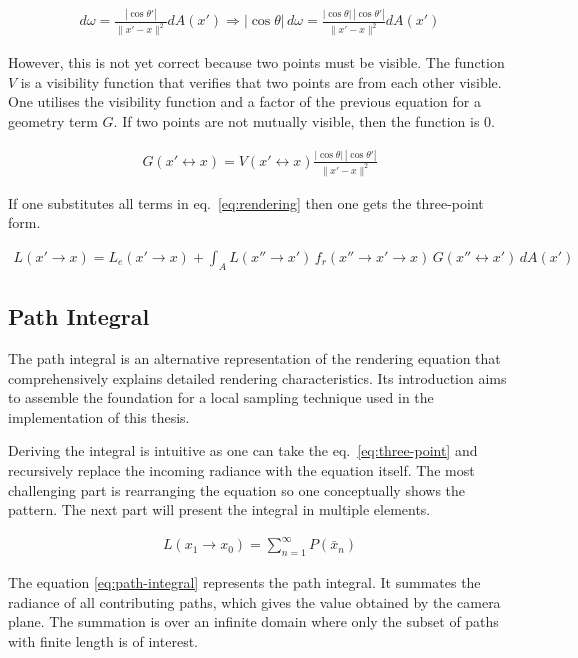 \begin{align*}
d\omega=\frac{|\cos\theta'|}{\|x'-x\|^2}dA(x') \Rightarrow |\cos\theta|\,d\omega=\frac{|\cos\theta|\,|\cos\theta'|}{\|x'-x\|^2}dA(x')
\end{align*}

However, this is not yet correct because two points must be visible.
The function $V$ is a visibility function that verifies that two points are from each other visible.
One utilises the visibility function and a factor of the previous equation for a geometry term $G$. If two points are not mutually visible, then the function is 0.

\begin{align*}
G(x'\leftrightarrow x)=V(x'\leftrightarrow x)\frac{|\cos\theta|\,|\cos\theta'|}{\|x'-x\|^2}
\end{align*}

If one substitutes all terms in eq.~\ref{eq:rendering} then one gets the three-point form.

\begin{align}
L(x'\rightarrow x)=L_e(x'\rightarrow x)+\int_{A}L(x''\rightarrow x')\,f_r(x''\rightarrow x'\rightarrow x)\,G(x''\leftrightarrow x')\,dA(x')
\label{eq:three-point}
\end{align}

\subsection{Path Integral}

The path integral is an alternative representation of the rendering equation that comprehensively explains detailed rendering characteristics.
Its introduction aims to assemble the foundation for a local sampling technique used in the implementation of this thesis.

Deriving the integral is intuitive as one can take the eq.~\ref{eq:three-point} and recursively replace the incoming radiance with the equation itself.
The most challenging part is rearranging the equation so one conceptually shows the pattern.
The next part will present the integral in multiple elements.

\begin{align}
L(x_1\rightarrow x_0)=\sum_{n=1}^\infty P(\bar{x}_n)
\label{eq:path-integral}
\end{align}

The equation \ref{eq:path-integral} represents the path integral.
It summates the radiance of all contributing paths, which gives the value obtained by the camera plane.
The summation is over an infinite domain where only the subset of paths with finite length is of interest.

